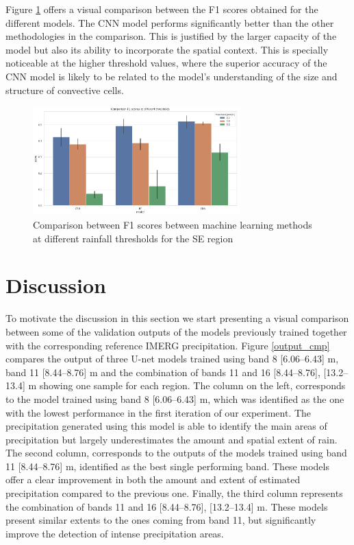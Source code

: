 \documentclass[3p,times]{elsarticle}
\begin{document}
Figure \ref{model_cmp} offers a visual comparison between the F1 scores obtained for the different models. The CNN model performs significantly better than the other methodologies in the comparison. This is justified by the larger capacity of the model but also its ability to incorporate the spatial context. This is specially noticeable at the higher threshold values, where the superior accuracy of the CNN model is likely to be related to the model's understanding of the size and structure of convective cells.

\begin{figure}%
    \includegraphics[width=8cm]{model_cmp.png}
    \caption{Comparison between F1 scores between machine learning methods at different rainfall thresholds for the SE region}%
    \label{model_cmp}%
\end{figure}


\section{Discussion}

To motivate the discussion in this section we start presenting a visual comparison between some of the validation outputs of the models previously trained together with the corresponding reference IMERG precipitation. Figure \ref{output_cmp} compares the output of three U-net models trained using band 8 [6.06–6.43] \textmu m, band 11 [8.44–8.76] \textmu m and the combination of bands 11 and 16 [8.44–8.76], [13.2–13.4] \textmu m showing one sample for each region. The column on the left, corresponds to the model trained using band 8 [6.06–6.43] \textmu m, which was identified as the one with the lowest performance in the first iteration of our experiment. The precipitation generated using this model is able to identify the main areas of precipitation but largely underestimates the amount and spatial extent of rain. The second column, corresponds to the outputs of the models trained using band 11 [8.44–8.76] \textmu m, identified as the best single performing band. These models offer a clear improvement in both the amount and extent of estimated precipitation compared to the previous one. Finally, the third column represents the combination of bands 11 and 16 [8.44–8.76], [13.2–13.4] \textmu m. These models present similar extents to the ones coming from band 11, but significantly improve the detection of intense precipitation areas.
\end{document}

